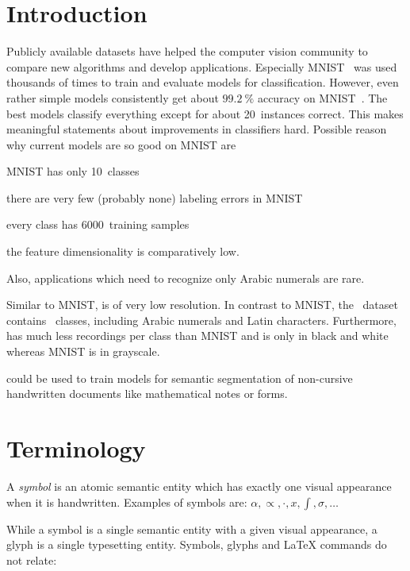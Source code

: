 \section{Introduction}
Publicly available datasets have helped the computer vision community to
compare new algorithms and develop applications. Especially
MNIST~\cite{LeNet-5} was used thousands of times to train and evaluate models
for classification. However, even rather simple models consistently get about
$\SI{99.2}{\percent}$ accuracy on MNIST~\cite{TF-MNIST-2016}. The best models
classify everything except for about 20~instances correct. This makes
meaningful statements about improvements in classifiers hard. Possible reason
why current models are so good on MNIST are
\begin{enumerate*}
    \item MNIST has only 10~classes
    \item there are very few (probably none) labeling errors in MNIST
    \item every class has \num{6000}~training samples
    \item the feature dimensionality is comparatively low.
\end{enumerate*}
Also, applications which need to recognize only Arabic numerals are rare.

Similar to MNIST, \dbName{} is of very low resolution. In contrast to MNIST,
the \dbNameVersion~dataset contains \dbTotalClasses~classes, including Arabic
numerals and Latin characters. Furthermore, \dbNameVersion{} has much less
recordings per class than MNIST and is only in black and white whereas
MNIST is in grayscale.

\dbName{} could be used to train models for semantic segmentation of
non-cursive handwritten documents like mathematical notes or forms.

\section{Terminology}
A \textit{symbol} is an atomic semantic entity which has exactly one visual
appearance when it is handwritten. Examples of symbols are:
$\alpha, \propto, \cdot, x, \int, \sigma, \dots$

While a symbol is a single semantic entity with a given visual appearance, a
glyph is a single typesetting entity. Symbols, glyphs and \LaTeX{} commands do
not relate:

